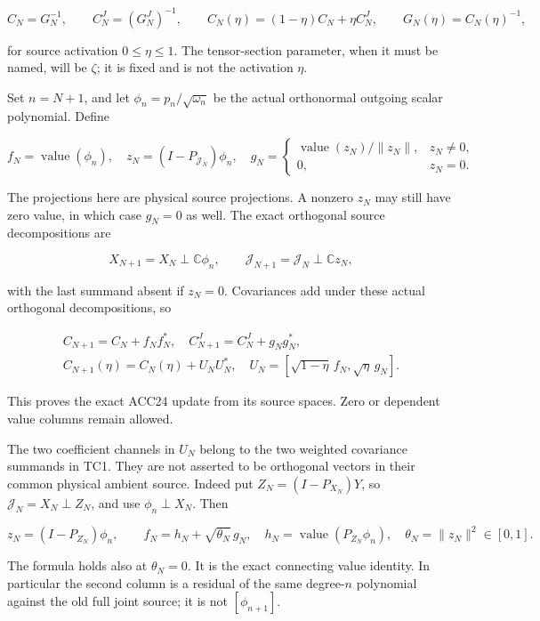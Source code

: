 \documentclass[11pt]{article}
\begin{document}
\[
C_N=G_N^{-1},\qquad C_N^J=(G_N^J)^{-1},\qquad
C_N(\eta)=(1-\eta)C_N+\eta C_N^J,
\qquad G_N(\eta)=C_N(\eta)^{-1},
\tag{TC1}
\]

for source activation \(0\le\eta\le1\). The tensor-section parameter, when it must be named, will be \(\zeta\); it is fixed and is not the activation \(\eta\).

Set \(n=N+1\), and let \(\phi_n=p_n/\sqrt{\omega_n}\) be the actual orthonormal outgoing scalar polynomial. Define

\[
f_N=\operatorname{value}(\phi_n),\quad
z_N=(I-P_{\mathcal J_N})\phi_n,\quad
g_N=\begin{cases}\operatorname{value}(z_N)/\|z_N\|,&z_N\ne0,\\0,&z_N=0.\end{cases}
\tag{TC2}
\]

The projections here are physical source projections. A nonzero \(z_N\) may still have zero value, in which case \(g_N=0\) as well. The exact orthogonal source decompositions are

\[
X_{N+1}=X_N\mathbin{\perp}\mathbb C\phi_n,
\qquad
\mathcal J_{N+1}=\mathcal J_N\mathbin{\perp}\mathbb Cz_N,
\tag{TC3}
\]

with the last summand absent if \(z_N=0\). Covariances add under these actual orthogonal decompositions, so

\[
\begin{gathered}
C_{N+1}=C_N+f_Nf_N^*,\quad
C_{N+1}^J=C_N^J+g_Ng_N^*,\\
C_{N+1}(\eta)=C_N(\eta)+U_NU_N^*,
\quad U_N=[\sqrt{1-\eta}\,f_N,\sqrt\eta\,g_N].
\end{gathered}
\tag{TC4}
\]

This proves the exact ACC24 update from its source spaces. Zero or dependent value columns remain allowed.

The two coefficient channels in \(U_N\) belong to the two weighted covariance summands in TC1. They are not asserted to be orthogonal vectors in their common physical ambient source. Indeed put \(Z_N=(I-P_{X_N})Y\), so \(\mathcal J_N=X_N\mathbin{\perp}Z_N\), and use \(\phi_n\perp X_N\). Then

\[
z_N=(I-P_{Z_N})\phi_n,\qquad
f_N=h_N+\sqrt{\theta_N}\,g_N,
\quad h_N=\operatorname{value}(P_{Z_N}\phi_n),
\quad \theta_N=\|z_N\|^2\in[0,1].
\tag{TC5}
\]

The formula holds also at \(\theta_N=0\). It is the exact connecting value identity. In particular the second column is a residual of the same degree-\(n\) polynomial against the old full joint source; it is not \([\phi_{n+1}]\).
\end{document}
